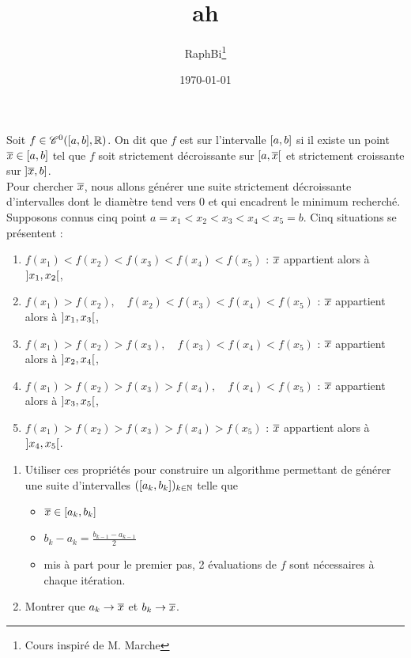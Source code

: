 \documentclass[french,a4paper,10pt]{article}
\title{\color{astral} \sffamily \bfseries 	ah }
\author{RaphBi\thanks{Cours inspiré de M. Marche}}
\date{\today}
\begin{document}
	\maketitle
	\begin{td-exo}
		Soit $f\in\mathscr{C}^0(\mathopen{[}a,b\mathclose{]},\mathbb{R})$. On dit que $f$ est  sur l'intervalle $\mathopen{[}a,b\mathclose{]}$ si il existe un point $\overline{x}\in\mathopen{[}a,b\mathclose{]}$ tel que $f$ soit strictement décroissante sur $\mathopen{[}a,\overline{x}\mathclose{[}$ et strictement croissante sur $\mathopen{]}\overline{x}, b\mathclose{]}$.\\
		Pour chercher $\overline{x}$, nous allons générer une suite strictement décroissante d'intervalles dont le diamètre tend vers 0 et qui encadrent le minimum recherché.\\
		
		Supposons connus cinq point $a=x_1<x_2<x_3<x_4<x_5=b$. Cinq situations se présentent :
			\begin{enumerate}[label=$(\roman*)$]
				\item $f(x_1)<f(x_2)<f(x_3)<f(x_4)<f(x_5)$ : $\overline{x}$ appartient alors à $\mathopen{]}x_1,x_2\mathclose{[}$,
				
				\item $f(x_1)>f(x_2),\quad f(x_2)<f(x_3)<f(x_4)<f(x_5)$ : $\overline{x}$ appartient alors à $\mathopen{]}x_1,x_3\mathclose{[}$,
				
				\item $f(x_1)>f(x_2)>f(x_3),\quad f(x_3)<f(x_4)<f(x_5)$ : $\overline{x}$ appartient alors à $\mathopen{]}x_2,x_4\mathclose{[}$,
				
				\item $f(x_1)>f(x_2)>f(x_3)>f(x_4),\quad f(x_4)<f(x_5)$ : $\overline{x}$ appartient alors à $\mathopen{]}x_3,x_5\mathclose{[}$,
				
				\item $f(x_1)>f(x_2)>f(x_3)>f(x_4)>f(x_5)$ : $\overline{x}$ appartient alors à $\mathopen{]}x_4,x_5\mathclose{[}$.
			\end{enumerate}
		\begin{enumerate}
			\item Utiliser ces propriétés pour construire un algorithme permettant de générer une suite d'intervalles $(\mathopen{[}a_k,b_k\mathclose{]})_{k\in\mathbb{N}}$ telle que
				\begin{itemize}
					\item $\overline{x}\in\mathopen{[}a_k,b_k\mathclose{]}$
					
					\item $b_k-a_k=\frac{b_{k-1}-a_{k-1}}2$
					
					\item mis à part pour le premier pas, 2 évaluations de $f$ sont nécessaires à chaque itération.
				\end{itemize}
			\item Montrer que $a_k\to\overline{x}$ et $b_k\to \overline{x}$.
		\end{enumerate}
	\end{td-exo}
	
\end{document}
